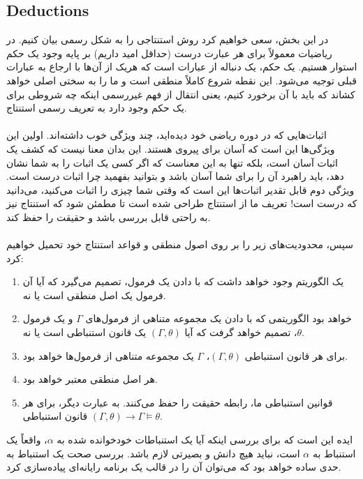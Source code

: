 \documentclass[10pt,a4paper]{article}
\begin{document}
                \subsection{Deductions}
در این بخش، سعی خواهیم کرد روش استنتاجی را به شکل رسمی بیان کنیم. در ریاضیات معمولاً برای هر عبارت درست (حداقل امید داریم) بر پایه وجود یک حکم استوار هستیم. یک حکم، یک دنباله از عبارات است که هریک از آن‌ها با ارجاع به عبارات قبلی توجیه می‌شود. این نقطه شروع کاملاً منطقی است و ما را به سختی اصلی خواهد کشاند که باید با آن برخورد کنیم، یعنی انتقال از فهم غیررسمی اینکه چه شروطی برای یک حکم وجود دارد به تعریف رسمی استنتاج.
                    \\
                    \\
                    اثبات‌هایی که در دوره ریاضی خود دیده‌اید، چند ویژگی خوب داشته‌اند. اولین این ویژگی‌ها این است که آسان برای پیروی هستند. این بدان معنا نیست که کشف یک اثبات آسان است، بلکه تنها به این معناست که اگر کسی یک اثبات را به شما نشان دهد، باید راهبرد آن را برای شما آسان باشد و بتوانید بفهمید چرا اثبات درست است. ویژگی دوم قابل تقدیر اثبات‌ها این است که وقتی شما چیزی را اثبات می‌کنید، می‌دانید که درست است! تعریف ما از استنتاج طراحی شده است تا مطمئن شود که استنتاج نیز به راحتی قابل بررسی باشد و حقیقت را حفظ کند.
                    \\
                    \\
سپس، محدودیت‌های زیر را بر روی اصول منطقی و قواعد استنتاج خود تحمیل خواهیم کرد:
                    \begin{enumerate}
                        \item یک الگوریتم وجود خواهد داشت که با دادن یک فرمول، تصمیم می‌گیرد که آیا آن فرمول یک اصل منطقی است یا نه.
                        \item خواهد بود الگوریتمی که با دادن یک مجموعه متناهی از فرمول‌های $\Gamma$ و یک فرمول $\theta$، تصمیم خواهد گرفت که آیا $(\Gamma,\theta)$ یک قانون استنباطی است یا نه.
                        \item برای هر قانون استنباطی $(\Gamma,\theta)$، $\Gamma$ یک مجموعه متناهی از فرمول‌ها خواهد بود.
                        \item هر اصل منطقی معتبر خواهد بود.
                        \item قوانین استنباطی ما، رابطه حقیقت را حفظ می‌کنند. به عبارت دیگر، برای هر قانون استنباطی $(\Gamma, \theta)\rightarrow \Gamma\vDash\theta$.
                    \end{enumerate}
                    ایده این است که برای بررسی اینکه آیا یک استنباطات خودخوانده شده به $\alpha$، واقعاً یک استنباط به $\alpha$ است، نباید هیچ دانش و بصیرتی لازم باشد. بررسی صحت یک استنباط به حدی ساده خواهد بود که می‌توان آن را در قالب یک برنامه رایانه‌ای پیاده‌سازی کرد.
\end{document}

